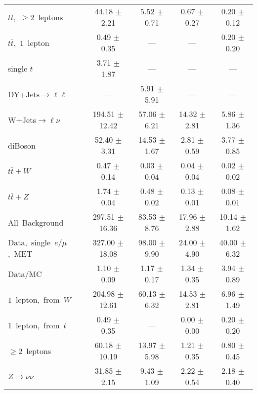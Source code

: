 \documentclass{article}
\begin{document}
\begin{longtable}{|l|c|c|c|c|}
$t\bar{t}$,~$\ge2$~leptons & 44.18 $\pm$ 2.21  & 5.52 $\pm$ 0.71  & 0.67 $\pm$ 0.27  & 0.20 $\pm$ 0.12 \\* 
$t\bar{t}$,~$1$~lepton & 0.49 $\pm$ 0.35  & ---  & ---  & 0.20 $\pm$ 0.20 \\* 
single $t$  & 3.71 $\pm$ 1.87  & ---  & ---  & --- \\* 
DY+Jets$\rightarrow\ell\ell$  & ---  & 5.91 $\pm$ 5.91  & ---  & --- \\* 
W+Jets$\rightarrow\ell\nu$  & 194.51 $\pm$ 12.42  & 57.06 $\pm$ 6.21  & 14.32 $\pm$ 2.81  & 5.86 $\pm$ 1.36 \\* 
diBoson  & 52.40 $\pm$ 3.31  & 14.53 $\pm$ 1.67  & 2.81 $\pm$ 0.59  & 3.77 $\pm$ 0.85 \\* 
$t\bar{t}+W$  & 0.47 $\pm$ 0.14  & 0.03 $\pm$ 0.04  & 0.04 $\pm$ 0.04  & 0.02 $\pm$ 0.02 \\* 
$t\bar{t}+Z$  & 1.74 $\pm$ 0.04  & 0.48 $\pm$ 0.02  & 0.13 $\pm$ 0.01  & 0.08 $\pm$ 0.01 \\* 
\hline \hline 
All~Background  & 297.51 $\pm$ 16.36  & 83.53 $\pm$ 8.76  & 17.96 $\pm$ 2.88  & 10.14 $\pm$ 1.62 \\* 
Data,~single~$e/\mu$,~MET  & 327.00 $\pm$ 18.08  & 98.00 $\pm$ 9.90  & 24.00 $\pm$ 4.90  & 40.00 $\pm$ 6.32 \\* 
Data/MC  & 1.10 $\pm$ 0.09  & 1.17 $\pm$ 0.17  & 1.34 $\pm$ 0.35  & 3.94 $\pm$ 0.89 \\* 
\hline \hline 
$1$~lepton,~from~$W$  & 204.98 $\pm$ 12.61  & 60.13 $\pm$ 6.32  & 14.53 $\pm$ 2.81  & 6.96 $\pm$ 1.49 \\* 
$1$~lepton,~from~$t$  & 0.49 $\pm$ 0.35  & ---  & 0.00 $\pm$ 0.00  & 0.20 $\pm$ 0.20 \\* 
$\ge2$~leptons  & 60.18 $\pm$ 10.19  & 13.97 $\pm$ 5.98  & 1.21 $\pm$ 0.35  & 0.80 $\pm$ 0.45 \\* 
$Z\rightarrow\nu\nu$  & 31.85 $\pm$ 2.15  & 9.43 $\pm$ 1.09  & 2.22 $\pm$ 0.54  & 2.18 $\pm$ 0.40 \\* 
\hline 
\end{longtable} 

 
 
 
 
\pagebreak 

 
 
 
 
\end{document}

